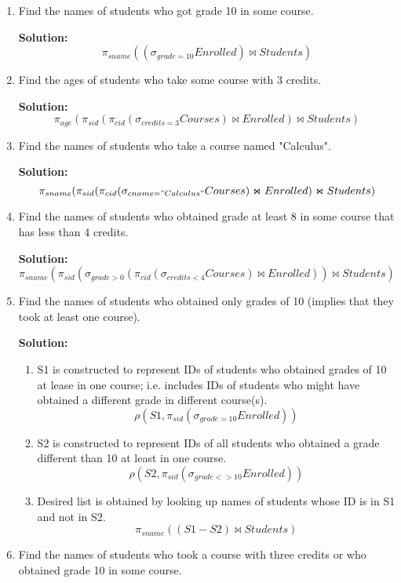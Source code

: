 \begin{enumerate}
  \item Find the names of students who got grade 10 in some course.

  \textbf{Solution:}
  $$\displaystyle \pi_{sname}((\sigma_{grade=10}Enrolled)\Join Students)$$
  \item Find the ages of students who take some course with 3 credits.

  \textbf{Solution:}
  $$\displaystyle \pi_{age} (\pi_{sid} (\pi_{cid} (\sigma_{credits=3}Courses) \Join Enrolled) \Join Students)$$
  \item Find the names of students who take a course named "Calculus".

  \textbf{Solution:}
  $$\displaystyle \pi_{sname} (\pi_{sid} (\pi_{cid} (\sigma_{cname="Calculus"}Courses) \Join Enrolled)\Join Students)$$
  \item Find the names of students who obtained grade at least 8 in some course that has less than 4 credits.

  \textbf{Solution:}
  $$\displaystyle \pi_{sname} (\pi_{sid} (\sigma_{grade>0}(\pi_{cid} (\sigma_{credits<4}Courses) \Join Enrolled)) \Join Students) $$

  \item Find the names of students who obtained only grades of 10 (implies that they took at least one course).

  \textbf{Solution:}
  \begin{enumerate}
  \item S1 is constructed to represent IDs of students who obtained grades of 10 at lease in one course; i.e. includes IDs of students who might have obtained a different grade in different course(s).
  $$\displaystyle \rho(S1, \pi_{sid}( \sigma_{grade=10}Enrolled)) $$
  \item S2 is constructed to represent IDs of all students who obtained a grade different than 10 at least in one course.
  $$\displaystyle \rho(S2, \pi_{sid}(\sigma_{grade<>10}Enrolled)) $$
  \item Desired list is obtained by looking up names of students whose ID is in S1 and not in S2.
  $$\displaystyle \pi_{sname}((S1-S2) \Join Students) $$
  \end{enumerate}

  \item Find the names of  students who took a course with three credits or who obtained grade 10 in some course.


\end{enumerate}
